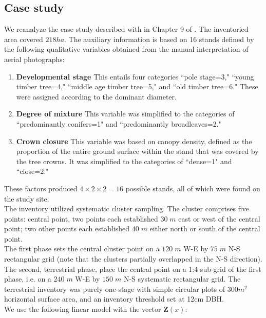\documentclass[a4paper,12pt,leqno, titlepage]{article}
\begin{document}
\subsection{Case study}
We reanalyze the case study described with in Chapter 9 of \cite{mandallaz}. The inventoried area covered $218ha$.  The auxiliary information is based on 16 stands defined by the following qualitative variables obtained from the manual interpretation of aerial photographs:
\begin{enumerate}
\item
\textbf{Developmental stage} \newline This entails four categories
``pole stage=3," ``young timber tree=4," ``middle age timber
tree=5," and ``old timber tree=6." These were assigned according to
the dominant diameter.
\item
\textbf{Degree of mixture} \newline This variable was simplified to
the categories of ``predominantly conifers=1" and ``predominantly
broadleaves=2."
\item \textbf{Crown closure} \newline
This variable was based on canopy density, defined as the proportion
of the entire ground surface within the stand that was covered by
the tree crowns. It was simplified to the categories of ``dense=1"
and ``close=2."
\end{enumerate}
These factors produced $4 \times 2 \times 2=16$ possible stands, all
of which were found on the study site. \\
The inventory utilized systematic cluster sampling. The cluster
comprises five points: central point, two points each established
$30\;m$ east or west of the central point; two other points each
established $40\;m$ either north or south of the central point.\\
The first phase sets the
central cluster point on a $120\;m$ W-E by $75\;m$ N-S rectangular
grid (note that the clusters partially overlapped in the N-S
direction). The second, terrestrial phase, place the central point on a 1:4
sub-grid of the first phase, i.e. on a $240\;m$ W-E by $150\;m$ N-S
systematic rectangular grid. The terrestrial inventory was purely one-stage
with simple circular plots of $300m^2$ horizontal surface area, and
an inventory threshold set at 12cm DBH.\\
We use the following linear model with the
vector $\pmb{Z}(x)$:
\end{document}

